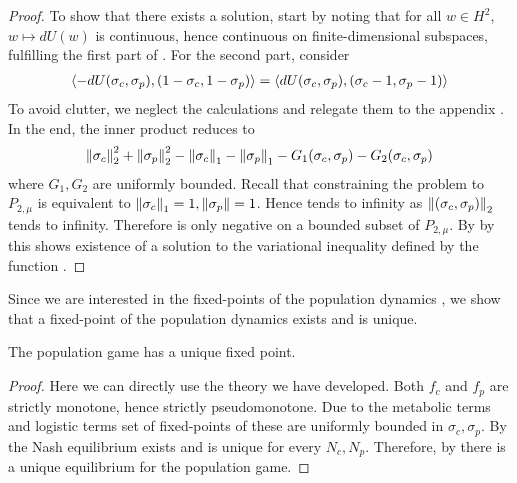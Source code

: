 \begin{proof}
  To show that there exists a solution, start by noting that for all $w\in H^2$, $w\mapsto dU(w)$ is continuous, hence continuous on finite-dimensional subspaces, fulfilling the first part of . For the second part,  consider
  \begin{equation}
    \label{eq:du}
    \begin{split}
    \left \langle -dU(\sigma_c,\sigma_p),(1-\sigma_c, 1-\sigma_p) \right \rangle =
    \left \langle dU(\sigma_c,\sigma_p),(\sigma_c-1, \sigma_p-1) \right \rangle
  \end{split}
  \end{equation}
  To avoid clutter, we neglect the calculations and relegate them to the appendix . In the end, the inner product reduces to
  \begin{equation}
    \label{eq:fin_exist}
    \left \Vert \sigma_c \right \Vert_2^2 + \left \Vert \sigma_p \right \Vert_2^2 - \left \Vert \sigma_c \right \Vert_1 - \left \Vert \sigma_p \right \Vert_1 - G_1(\sigma_c,\sigma_p) - G_2(\sigma_c,\sigma_p)
  \end{equation}
  where $G_1,G_2$ are uniformly bounded. Recall that constraining the problem to $P_{2,\mu}$ is equivalent to $\left \Vert \sigma_c \right \Vert_1 = 1, \left \Vert \sigma_p \right \Vert = 1$. Hence  tends to infinity as $\left \Vert (\sigma_c,\sigma_p) \right \Vert_2$ tends to infinity. Therefore  is only negative on a bounded subset of $P_{2,\mu}$. By by  this shows existence of a solution to the variational inequality defined by the function .

\end{proof}
Since we are interested in the fixed-points of the population dynamics , we show that a fixed-point of the population dynamics exists and is unique.
\begin{corollary}
  The population game  has a unique fixed point.
\end{corollary}
\begin{proof}
Here we can directly use the theory we have developed.  Both $f_c$ and $f_p$ are strictly monotone, hence strictly pseudomonotone. Due to the metabolic terms and logistic terms set of fixed-points of these are uniformly bounded in $\sigma_c, \sigma_p$. By  the Nash equilibrium exists and is unique for every $N_c, N_p$. Therefore, by  there is a unique equilibrium for the population game.
\end{proof}
